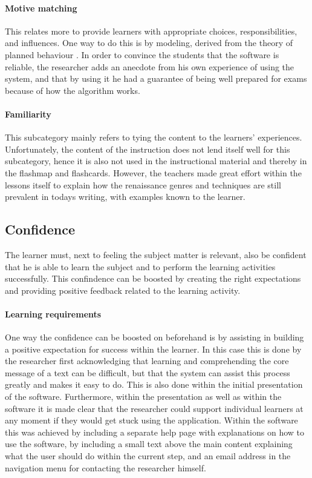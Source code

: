 \paragraph{Motive matching} This relates more to provide learners with appropriate choices, responsibilities, and influences. One way to do this is by modeling, derived from the theory of planned behaviour \cite{theoryplannedbehaviour}. In order to convince the students that the software is reliable, the researcher adds an anecdote from his own experience of using the system, and that by using it he had a guarantee of being well prepared for exams because of how the algorithm works.

\paragraph{Familiarity} This subcategory mainly refers to tying the content to the learners' experiences. Unfortunately, the content of the instruction does not lend itself well for this subcategory, hence it is also not used in the instructional material and thereby in the flashmap and flashcards. However, the teachers made great effort within the lessons itself to explain how the renaissance genres and techniques are still prevalent in todays writing, with examples known to the learner.

        \subsection{Confidence}

The learner must, next to feeling the subject matter is relevant, also be confident that he is able to learn the subject and to perform the learning activities successfully. This confindence can be boosted by creating the right expectations and providing positive feedback related to the learning activity.
        
\paragraph{Learning requirements} One way the confidence can be boosted on beforehand is by assisting in building a positive expectation for success within the learner. In this case this is done by the researcher first acknowledging that learning and comprehending the core message of a text can be difficult, but that the system can assist this process greatly and makes it easy to do. This is also done within the initial presentation of the software. Furthermore, within the presentation as well as within the software it is made clear that the researcher could support individual learners at any moment if they would get stuck using the application. Within the software this was achieved by including a separate help page with explanations on how to use the software, by including a small text above the main content explaining what the user should do within the current step, and an email address in the navigation menu for contacting the researcher himself.

